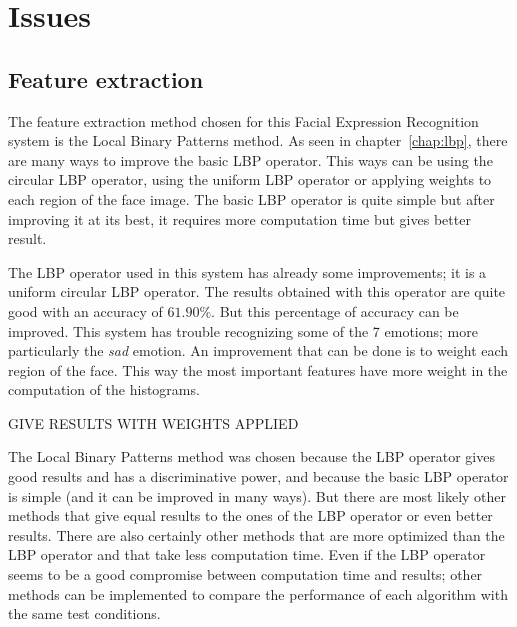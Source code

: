 \chapter{Issues}
\label{chap:eval_issues}

\section{Feature extraction}

\vspace{\baselineskip}
\noindent The feature extraction method chosen for this Facial Expression Recognition system is the Local Binary Patterns method. As seen in chapter~\ref{chap:lbp}, there are many ways to improve the basic LBP operator. This ways can be using the circular LBP operator, using the uniform LBP operator or applying weights to each region of the face image. The basic LBP operator is quite simple but after improving it at its best, it requires more computation time but gives better result.
\newline

\noindent The LBP operator used in this system has already some improvements; it is a uniform circular LBP operator. The results obtained with this operator are quite good with an accuracy of $ 61.90\% $. But this percentage of accuracy can be improved. This system has trouble recognizing some of the 7 emotions; more particularly the \textit{sad} emotion. An improvement that can be done is to weight each region of the face. This way the most important features have more weight in the computation of the histograms.
\newline

\noindent GIVE RESULTS WITH WEIGHTS APPLIED
\newline

\noindent The Local Binary Patterns method was chosen because the LBP operator gives good results and has a discriminative power, and because the basic LBP operator is simple (and it can be improved in many ways). But there are most likely other methods that give equal results to the ones of the LBP operator or even better results. There are also certainly other methods that are more optimized than the LBP operator and that take less computation time. Even if the LBP operator seems to be a good compromise between computation time and results; other methods can be implemented to compare the performance of each algorithm with the same test conditions.
\newline

